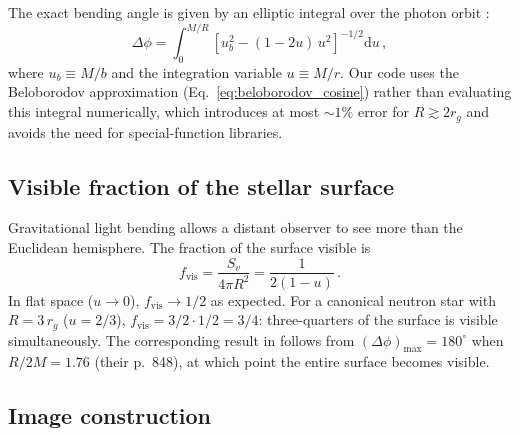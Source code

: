 The exact bending angle is given by an elliptic integral over the photon
orbit \citep[Eq.~2.12]{pechenick_1983}:
\begin{equation}
  \Delta\phi
    = \int_{0}^{M/R}
      \left[u_b^{2} - (1 - 2u)\,u^{2}\right]^{-1/2}\!\mathrm{d}u\,,
  \label{eq:exact_bending}
\end{equation}
where $u_b \equiv M/b$ and the integration variable $u \equiv M/r$.  Our
code uses the Beloborodov approximation (Eq.~\ref{eq:beloborodov_cosine})
rather than evaluating this integral numerically, which introduces at most
$\sim 1\%$ error for $R \gtrsim 2r_g$ and avoids the need for special-function
libraries.

\subsection{Visible fraction of the stellar surface}

Gravitational light bending allows a distant observer to see more than the
Euclidean hemisphere.  The fraction of the surface visible is
\citep[Sect.~3]{beloborodov_2002}
\begin{equation}
  f_{\mathrm{vis}}
    = \frac{S_{v}}{4\pi R^{2}}
    = \frac{1}{2(1 - u)}\,.
  \label{eq:visible_fraction}
\end{equation}
In flat space ($u \to 0$), $f_{\mathrm{vis}} \to 1/2$ as expected.  For a
canonical neutron star with $R = 3\,r_g$ ($u = 2/3$),
$f_{\mathrm{vis}} = 3/2 \cdot 1/2 = 3/4$: three-quarters of the surface is
visible simultaneously.  The corresponding result in \citet{pechenick_1983}
follows from $(\Delta\phi)_{\max} = 180^{\circ}$ when $R/2M = 1.76$
(their p.~848), at which point the entire surface becomes visible.

\subsection{Image construction}

